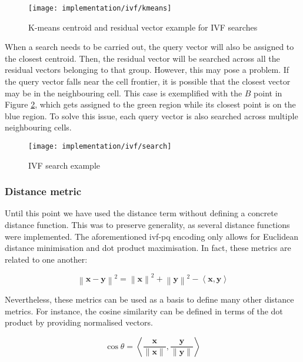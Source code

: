 \documentclass[../main.tex]{subfiles}
\begin{document}
\begin{figure}[htbp]
    \centering
    \texttt{[image: implementation/ivf/kmeans]}
    \caption{K-means centroid and residual vector example for IVF searches}
    \label{fig:4:ivf_kmeans}
\end{figure}

When a search needs to be carried out, the query vector will also be assigned to the closest centroid. Then, the residual vector will be searched across all the residual vectors belonging to that group. However, this may pose a problem. If the query vector falls near the cell frontier, it is possible that the closest vector may be in the neighbouring cell. This case is exemplified with the $B$ point in Figure \ref{fig:4:ivf_search}, which gets assigned to the green region while its closest point is on the blue region. To solve this issue, each query vector is also searched across multiple neighbouring cells\cite{chang2022b}. 

\begin{figure}[htbp]
    \centering
    \texttt{[image: implementation/ivf/search]}
    \caption{IVF search example}
    \label{fig:4:ivf_search}
\end{figure}

\subsubsection{Distance metric}
Until this point we have used the distance term without defining a concrete distance function. This was to preserve generality, as several distance functions were implemented. The aforementioned \gls{ivf}-\gls{pq} encoding only allows for Euclidean distance minimisation and dot product maximisation. In fact, these metrics are related to one another:

\begin{equation}\label{eq:4:dot_l2}
    \left\lVert \bm{x} - \bm{y} \right\rVert^2 =
    \left\lVert \bm{x} \right\rVert^2 + \left\lVert \bm{y} \right\rVert^2 - \left\langle \bm{x},\bm{y} \right\rangle
\end{equation}

Nevertheless, these metrics can be used as a basis to define many other distance metrics. For instance, the cosine similarity can be defined in terms of the dot product by providing normalised vectors.

\begin{equation}\label{eq:4:cos}
    \cos \theta = \left\langle \frac{\bm{x}}{\lVert \bm{x} \rVert} , \frac{\bm{y}}{\lVert \bm{y} \rVert} \right\rangle
\end{equation}
\end{document}
